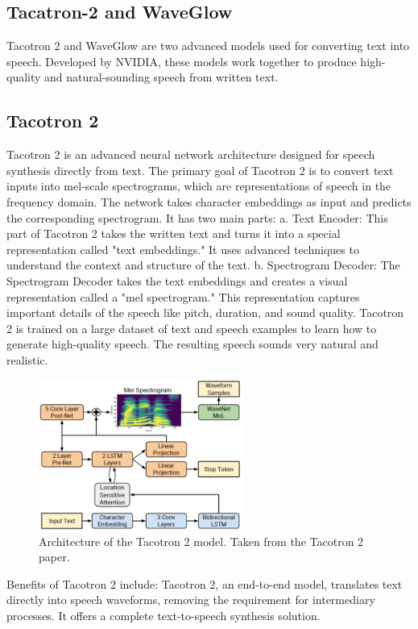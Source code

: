 \documentclass{article}
\begin{document}
\subsection{Tacatron-2 and WaveGlow}
Tacotron 2 and WaveGlow are two advanced models used for converting text into speech. Developed by NVIDIA, these models work together to produce high-quality and natural-sounding speech from written text.

\subsection{Tacotron 2}
Tacotron 2 is an advanced neural network architecture designed for speech synthesis directly from text. The primary goal of Tacotron 2 is to convert text inputs into mel-scale spectrograms, which are representations of speech in the frequency domain. The network takes character embeddings as input and predicts the corresponding spectrogram.
It has two main parts:
a. Text Encoder: This part of Tacotron 2 takes the written text and turns it into a special representation called "text embeddings." It uses advanced techniques to understand the context and structure of the text.
b. Spectrogram Decoder: The Spectrogram Decoder takes the text embeddings and creates a visual representation called a "mel spectrogram." This representation captures important details of the speech like pitch, duration, and sound quality.
Tacotron 2 is trained on a large dataset of text and speech examples to learn how to generate high-quality speech. The resulting speech sounds very natural and realistic.

\begin{figure}[htbp]
    \centering
    \includegraphics[width=0.6\textwidth]{tacotron2.png}
    \caption{Architecture of the Tacotron 2 model. Taken from the Tacotron 2 paper.}
    \label{fig:tacotron2}
\end{figure}

Benefits of Tacotron 2 include:
Tacotron 2, an end-to-end model, translates text directly into speech waveforms, removing the requirement for intermediary processes. It offers a complete text-to-speech synthesis solution.
\end{document}
